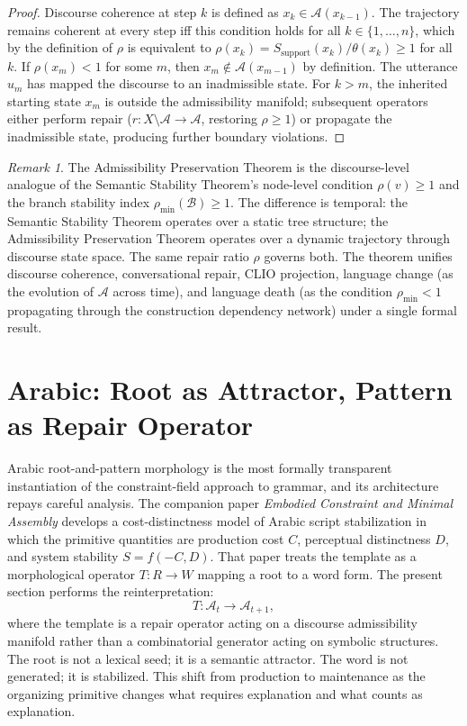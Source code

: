 \documentclass[11pt, a4paper]{article}
\theoremstyle{definition}
\theoremstyle{remark}
\newtheorem{remark}{Remark}
\begin{document}
\begin{proof}
Discourse coherence at step $k$ is defined as $x_k \in \mathcal{A}(x_{k-1})$.
The trajectory remains coherent at every step iff this condition holds for
all $k \in \{1, \ldots, n\}$, which by the definition of $\rho$ is equivalent
to $\rho(x_k) = S_{\mathrm{support}}(x_k)/\theta(x_k) \geq 1$ for all $k$.
If $\rho(x_m) < 1$ for some $m$, then $x_m \notin \mathcal{A}(x_{m-1})$ by
definition. The utterance $u_m$ has mapped the discourse to an inadmissible
state. For $k > m$, the inherited starting state $x_m$ is outside the
admissibility manifold; subsequent operators either perform repair
($r: X \setminus \mathcal{A} \to \mathcal{A}$, restoring $\rho \geq 1$) or
propagate the inadmissible state, producing further boundary violations.
\end{proof}

\begin{remark}
The Admissibility Preservation Theorem is the discourse-level analogue of
the Semantic Stability Theorem's node-level condition $\rho(v) \geq 1$ and
the branch stability index $\rho_{\min}(\mathcal{B}) \geq 1$. The difference
is temporal: the Semantic Stability Theorem operates over a static tree
structure; the Admissibility Preservation Theorem operates over a dynamic
trajectory through discourse state space. The same repair ratio $\rho$
governs both. The theorem unifies discourse coherence, conversational repair,
CLIO projection, language change (as the evolution of $\mathcal{A}$ across
time), and language death (as the condition $\rho_{\min} < 1$ propagating
through the construction dependency network) under a single formal result.
\end{remark}

\section{Arabic: Root as Attractor, Pattern as Repair Operator}

Arabic root-and-pattern morphology is the most formally transparent
instantiation of the constraint-field approach to grammar, and its
architecture repays careful analysis. The companion paper \textit{Embodied
Constraint and Minimal Assembly} develops a cost-distinctness model of Arabic
script stabilization in which the primitive quantities are production cost
$C$, perceptual distinctness $D$, and system stability $S = f(-C, D)$.
That paper treats the template as a morphological operator $T: R \to W$
mapping a root to a word form. The present section performs the reinterpretation:
\[
T: \mathcal{A}_t \to \mathcal{A}_{t+1},
\]
where the template is a repair operator acting on a discourse admissibility
manifold rather than a combinatorial generator acting on symbolic structures.
The root is not a lexical seed; it is a semantic attractor. The word is not
generated; it is stabilized. This shift from production to maintenance as the
organizing primitive changes what requires explanation and what counts as
explanation.
\end{document}
